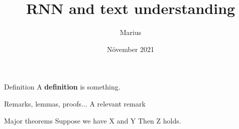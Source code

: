 \documentclass[pdf]{beamer}
\title{RNN and text understanding}
\author{Marius}
\date{Növember 2021}
\begin{document}
\maketitle
\begin{frame}

\begin{block}{Definition}
A \textbf{definition} is something.
\end{block}


\begin{exampleblock}{Remarks, lemmas, proofs...}
A relevant remark
\end{exampleblock}


\begin{alertblock}{Major theorems}
Suppose we have X and Y\newline
Then Z holds.
\end{alertblock}


\end{frame}
\end{document}
